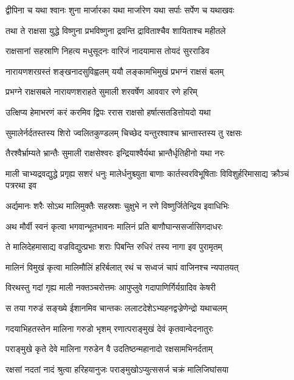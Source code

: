 \twolineshloka
{द्वीपिना च यथा श्वानः शुना मार्जारका यथा}
{मार्जारेण यथा सर्पाः सर्पेण च यथाखवः} %

\twolineshloka
{तथा ते राक्षसा युद्धे विष्णुना प्रभविष्णुना}
{द्रवन्ति द्राविताश्चैव शायिताश्च महीतले} %

\twolineshloka
{राक्षसानां सहस्राणि निहत्य मधुसूदनः}
{वारिजं नादयामास तोयदं सुरराडिव} %

\twolineshloka
{नारायणशरग्रस्तं शङ्खनादसुविह्वलम्}
{ययौ लङ्कामभिमुखं प्रभग्नं राक्षसं बलम्} %

\twolineshloka
{प्रभग्ने राक्षसबले नारायणशराहते}
{सुमाली शरवर्षेण आववार रणे हरिम्} %

\twolineshloka
{उत्क्षिप्य हेमाभरणं करं करमिव द्विपः}
{ररास राक्षसो हर्षात्सतडित्तोयदो यथा} %

\twolineshloka
{सुमालेर्नर्दतस्तस्य शिरो ज्वलितकुण्डलम्}
{चिच्छेद यन्तुरश्वाश्च भ्रान्तास्तस्य तु रक्षसः} %

\twolineshloka
{तैरश्वैर्भ्राम्यते भ्रान्तैः सुमाली राक्षसेश्वरः}
{इन्द्रियाश्वैर्यथा भ्रान्तैर्धृतिहीनो यथा नरः} %

\threelineshloka
{माली चाभ्यद्रवद्युद्धे प्रगृह्य सशरं धनुः}
{मालेर्धनुश्च्युता बाणाः कार्तस्वरविभूषिताः}
{विविशुर्हरिमासाद्य क्रौञ्चं पत्ररथा इव} %

\twolineshloka
{अर्द्यमानः शरैः सोऽथ मालिमुक्तैः सहस्रशः}
{चुक्षुभे न रणे विष्णुर्जितेन्द्रिय इवाधिभिः} %

\twolineshloka
{अथ मौर्वी स्वनं कृत्वा भगवान्भूतभावनः}
{मालिनं प्रति बाणौघान्ससर्जासिगदाधरः} %

\twolineshloka
{ते मालिदेहमासाद्य वज्रविद्युत्प्रभाः शराः}
{पिबन्ति रुधिरं तस्य नागा इव पुरामृतम्} %

\twolineshloka
{मालिनं विमुखं कृत्वा मालिमौलिं हरिर्बलात्}
{रथं च सध्वजं चापं वाजिनश्च न्यपातयत्} %

\twolineshloka
{विरथस्तु गदां गृह्य माली नक्तञ्चरोत्तमः}
{आपुप्लुवे गदापाणिर्गिर्यग्रादिव केषरी} %

\twolineshloka
{स तया गरुडं सङ्ख्ये ईशानमिव चान्तकः}
{ललाटदेशेऽभ्यहनद्वज्रेणेन्द्रो यथाचलम्} %

\twolineshloka
{गदयाभिहतस्तेन मालिना गरुडो भृशम्}
{रणात्पराङ्मुखं देवं कृतवान्वेदनातुरः} %

\twolineshloka
{पराङ्मुखे कृते देवे मालिना गरुडेन वै}
{उदतिष्ठन्महानादो रक्षसामभिनर्दताम्} %

\twolineshloka
{रक्षसां नदतां नादं श्रुत्वा हरिहयानुजः}
{पराङ्मुखोऽप्युत्ससर्ज चक्रं मालिजिघांसया} %

